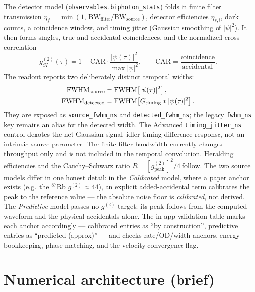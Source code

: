 \documentclass[11pt]{article}
\newcommand{\code}[1]{\texttt{#1}}
\begin{document}
The detector model (\code{observables.biphoton\_stats}) folds in finite filter
transmission $\eta_f=\min(1,\,\text{BW}_{\text{filter}}/\text{BW}_{\text{source}})$,
detector efficiencies $\eta_{s,i}$, dark counts, a coincidence window, and timing
jitter (Gaussian smoothing of $|\psi|^2$). It then forms singles, true and
accidental coincidences, and the normalized cross-correlation
\begin{equation}
g^{(2)}_{SI}(\tau)=1+\text{CAR}\cdot\frac{|\psi(\tau)|^2}{\max|\psi|^2},
\qquad
\text{CAR}=\frac{\text{coincidence}}{\text{accidental}}.
\end{equation}
The readout reports two deliberately distinct temporal widths:
\begin{align}
\mathrm{FWHM}_{\rm source}
  &= \mathrm{FWHM}\!\left[|\psi(\tau)|^2\right],\\
\mathrm{FWHM}_{\rm detected}
  &= \mathrm{FWHM}\!\left[G_{\rm timing}*|\psi(\tau)|^2\right].
\end{align}
They are exposed as \code{source\_fwhm\_ns} and \code{detected\_fwhm\_ns}; the
legacy \code{fwhm\_ns} key remains an alias for the detected width. The Advanced
\code{timing\_jitter\_ns} control denotes the net Gaussian signal--idler
timing-difference response, not an intrinsic source parameter. The finite filter
bandwidth currently changes throughput only and is not included in the temporal
convolution.
Heralding efficiencies and the Cauchy--Schwarz ratio $R=[g^{(2)}_{\text{peak}}]^2/4$
follow. The two source models differ in one honest detail: in the
\emph{Calibrated} model, where a paper anchor exists (e.g.\ the $^{87}$Rb
$g^{(2)}\!\approx\!44$), an explicit added-accidental term calibrates the peak
to the reference value --- the absolute noise floor is \emph{calibrated}, not
derived. The \emph{Predictive} model passes no $g^{(2)}$ target: its peak
follows from the computed waveform and the physical accidentals alone. The
in-app validation table marks each anchor accordingly --- calibrated entries as
``by construction'', predictive entries as ``predicted (approx)'' --- and checks
rate/OD/width anchors, energy bookkeeping, phase matching, and the velocity
convergence flag.

\section{Numerical architecture (brief)}
\end{document}
